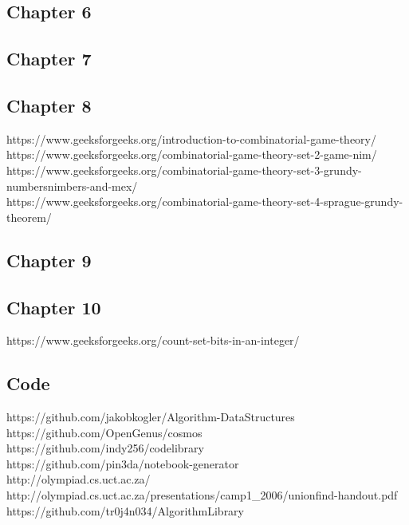 \subsection{Chapter 6}


\subsection{Chapter 7}


\subsection{Chapter 8}
https://www.geeksforgeeks.org/introduction-to-combinatorial-game-theory/ \\
https://www.geeksforgeeks.org/combinatorial-game-theory-set-2-game-nim/ \\
https://www.geeksforgeeks.org/combinatorial-game-theory-set-3-grundy-numbersnimbers-and-mex/ \\
https://www.geeksforgeeks.org/combinatorial-game-theory-set-4-sprague-grundy-theorem/ \\

\subsection{Chapter 9}


\subsection{Chapter 10}
https://www.geeksforgeeks.org/count-set-bits-in-an-integer/


\subsection{Code}
https://github.com/jakobkogler/Algorithm-DataStructures \\
https://github.com/OpenGenus/cosmos \\
https://github.com/indy256/codelibrary \\
https://github.com/pin3da/notebook-generator \\
http://olympiad.cs.uct.ac.za/ \\
http://olympiad.cs.uct.ac.za/presentations/camp1\_2006/unionfind-handout.pdf \\
https://github.com/tr0j4n034/AlgorithmLibrary \\
